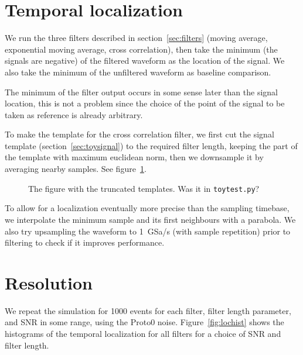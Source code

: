 
\section{Temporal localization}

We run the three filters described in section~\ref{sec:filters} (moving
average, exponential moving average, cross correlation), then take the minimum
(the signals are negative) of the filtered waveform as the location of the
signal. We also take the minimum of the unfiltered waveform as baseline
comparison.

The minimum of the filter output occurs in some sense later than the signal
location, this is not a problem since the choice of the point of the signal to
be taken as reference is already arbitrary.

To make the template for the cross correlation filter, we first cut the signal template (section~\ref{sec:toysignal}) to the required filter length, keeping the part of the template with maximum euclidean norm, then we downsample it by
averaging nearby samples. See figure~\ref{fig:toyfilttempl}.

\begin{figure}
    The figure with the truncated templates. Was it in \verb'toytest.py'?
    \caption{}
    \label{fig:toyfilttempl}
\end{figure}

To allow for a localization eventually more precise than the sampling timebase,
we interpolate the minimum sample and its first neighbours with a parabola. We
also try upsampling the waveform to \SI{1}{GSa/s} (with sample repetition)
prior to filtering to check if it improves performance.


\section{Resolution}

We repeat the simulation for 1000 events for each filter, filter length
parameter, and SNR in some range, using the Proto0 noise.
Figure~\ref{fig:lochist} shows the histograms of the temporal localization for
all filters for a choice of SNR and filter length.

